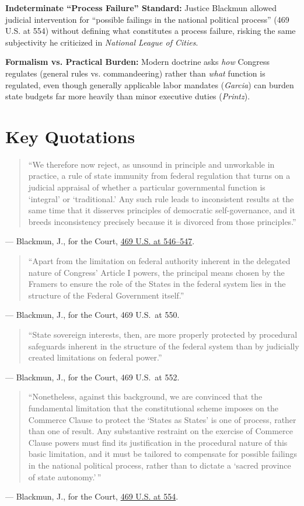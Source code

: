 \documentclass[12pt]{article}
\begin{document}
\textbf{Indeterminate ``Process Failure'' Standard:} Justice Blackmun allowed judicial intervention for ``possible failings in the national political process'' (469 U.S. at 554) without defining what constitutes a process failure, risking the same subjectivity he criticized in \textit{National League of Cities}.

\textbf{Formalism vs. Practical Burden:} Modern doctrine asks \textit{how} Congress regulates (general rules vs. commandeering) rather than \textit{what} function is regulated, even though generally applicable labor mandates (\textit{Garcia}) can burden state budgets far more heavily than minor executive duties (\textit{Printz}).

\section{Key Quotations}
\begin{quote}
``We therefore now reject, as unsound in principle and unworkable in practice, a rule of state immunity from federal regulation that turns on a judicial appraisal of whether a particular governmental function is `integral' or `traditional.' Any such rule leads to inconsistent results at the same time that it disserves principles of democratic self-governance, and it breeds inconsistency precisely because it is divorced from those principles.''
\end{quote}
\noindent --- Blackmun, J., for the Court, \href{https://supreme.justia.com/cases/federal/us/469/528/}{469 U.S. at 546--547}.

\begin{quote}
``Apart from the limitation on federal authority inherent in the delegated nature of Congress' Article I powers, the principal means chosen by the Framers to ensure the role of the States in the federal system lies in the structure of the Federal Government itself.''
\end{quote}
\noindent --- Blackmun, J., for the Court, 469 U.S.\ at 550.

\begin{quote}
``State sovereign interests, then, are more properly protected by procedural safeguards inherent in the structure of the federal system than by judicially created limitations on federal power.''
\end{quote}
\noindent --- Blackmun, J., for the Court, 469 U.S.\ at 552.

\begin{quote}
``Nonetheless, against this background, we are convinced that the fundamental limitation that the constitutional scheme imposes on the Commerce Clause to protect the `States as States' is one of process, rather than one of result. Any substantive restraint on the exercise of Commerce Clause powers must find its justification in the procedural nature of this basic limitation, and it must be tailored to compensate for possible failings in the national political process, rather than to dictate a `sacred province of state autonomy.'\,''
\end{quote}
\noindent --- Blackmun, J., for the Court, \href{https://supreme.justia.com/cases/federal/us/469/528/}{469 U.S. at 554}.
\end{document}
